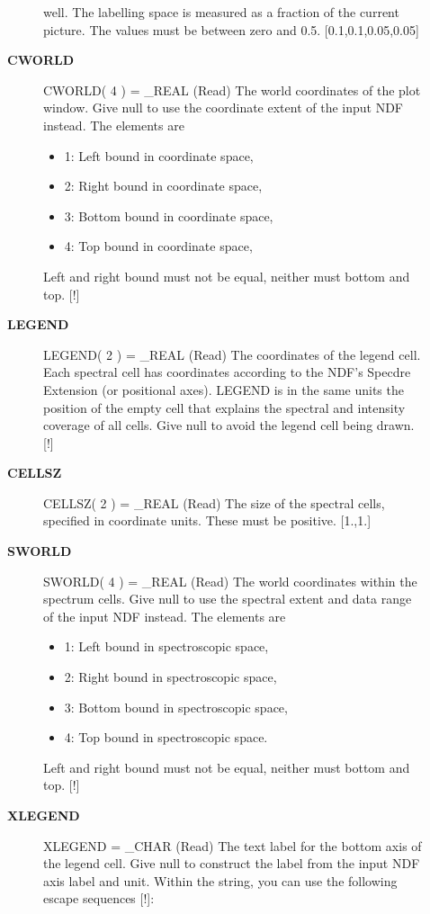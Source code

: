 \begin{description}
\begin{description}
   well. The labelling space is measured as a fraction of the
   current picture. The values must be between zero and 0.5.
   [0.1,0.1,0.05,0.05]
\item [\textbf{CWORLD}]
CWORLD( 4 ) = \_REAL (Read)
   The world coordinates of the plot window. Give null to use the
   coordinate extent of the input NDF instead. The elements are
   \begin{itemize}
   \item 1: Left bound in coordinate space,
   \item 2: Right bound in coordinate space,
   \item 3: Bottom bound in coordinate space,
   \item 4: Top bound in coordinate space,
   \end{itemize}
   Left and right bound must not be equal, neither must bottom and
   top. [!]
\item [\textbf{LEGEND}]
LEGEND( 2 ) = \_REAL (Read)
   The coordinates of the legend cell. Each spectral cell has
   coordinates according to the NDF's Specdre Extension (or
   positional axes). LEGEND is in the same units the position of
   the empty cell that explains the spectral and intensity
   coverage of all cells. Give null to avoid the legend cell being
   drawn. [!]
\item [\textbf{CELLSZ}]
CELLSZ( 2 ) = \_REAL (Read)
   The size of the spectral cells, specified in coordinate units.
   These must be positive. [1.,1.]
\item [\textbf{SWORLD}]
SWORLD( 4 ) = \_REAL (Read)
   The world coordinates within the spectrum cells. Give null to
   use the spectral extent and data range of the input NDF
   instead. The elements are
   \begin{itemize}
   \item 1: Left bound in spectroscopic space,
   \item 2: Right bound in spectroscopic space,
   \item 3: Bottom bound in spectroscopic space,
   \item 4: Top bound in spectroscopic space.
   \end{itemize}
   Left and right bound must not be equal, neither must bottom and
   top. [!]
\item [\textbf{XLEGEND}]
XLEGEND = \_CHAR (Read)
   The text label for the bottom axis of the legend cell. Give
   null to construct the label from the input NDF axis label and
   unit. Within the string, you can use the following escape
   sequences [!]:
   \begin{itemize}

\end{itemize}
\end{description}
\end{description}
